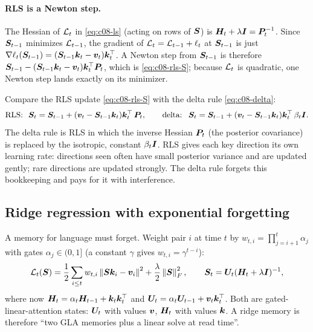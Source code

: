 \paragraph{RLS is a Newton step.} The Hessian of $\mathcal{L}_t$ in \eqref{eq:c08-ls} (acting on rows of
$\bm{S}$) is $\bm{H}_t+\lambda\bm{I}=\bm{P}_t^{-1}$. Since $\bm{S}_{t-1}$ minimizes $\mathcal{L}_{t-1}$, the gradient of
$\mathcal{L}_t=\mathcal{L}_{t-1}+\ell_t$ at $\bm{S}_{t-1}$ is just $\nabla\ell_t(\bm{S}_{t-1})=(\bm{S}_{t-1}\bm{k}_t-\bm{v}_t)
\bm{k}_t^{\top}$. A Newton step from $\bm{S}_{t-1}$ is therefore
$\bm{S}_{t-1}-(\bm{S}_{t-1}\bm{k}_t-\bm{v}_t)\bm{k}_t^{\top}\bm{P}_t$, which is \eqref{eq:c08-rls-S}; because $\mathcal{L}_t$ is
quadratic, one Newton step lands exactly on its minimizer.

\begin{keyidea}[title={Key idea: the delta rule is RLS with an identity covariance}]
Compare the RLS update \eqref{eq:c08-rls-S} with the delta rule \eqref{eq:c08-delta}:
\[
  \text{RLS: }\ \mS_t=\mS_{t-1}+(\vv_t-\mS_{t-1}\vk_t)\vk_t\T\,\mP_t, \qquad
  \text{delta: }\ \mS_t=\mS_{t-1}+(\vv_t-\mS_{t-1}\vk_t)\vk_t\T\,\beta_t\mI .
\]
The delta rule is RLS in which the inverse Hessian $\bm{P}_t$ (the posterior covariance) is replaced
by the isotropic, constant $\beta_t\bm{I}$. RLS gives each key direction its own learning rate:
directions seen often have small posterior variance and are updated gently; rare directions are
updated strongly. The delta rule forgets this bookkeeping and pays for it with interference.
\end{keyidea}

\subsection{Ridge regression with exponential forgetting}\label{sec:c08-ewridge}

A memory for language must forget. Weight pair $i$ at time $t$ by $w_{t,i}=\prod_{j=i+1}^{t}
\alpha_j$ with gates $\alpha_j\in(0,1]$ (a constant $\gamma$ gives $w_{t,i}=\gamma^{t-i}$):
\begin{equation}\label{eq:c08-ewls}
  \mathcal{L}_t(\bm{S})=\frac12\sum_{i\le t}w_{t,i}\left\lVert \bm{S}\bm{k}_i-\bm{v}_i\right\rVert^2+\frac{\lambda}{2}\left\lVert \bm{S}\right\rVert_F^2 ,
  \qquad
  \bm{S}_t=\bm{U}_t(\bm{H}_t+\lambda\bm{I})^{-1},
\end{equation}
where now $\bm{H}_t=\alpha_t\bm{H}_{t-1}+\bm{k}_t\bm{k}_t^{\top}$ and $\bm{U}_t=\alpha_t\bm{U}_{t-1}+\bm{v}_t\bm{k}_t^{\top}$. Both
are gated-linear-attention states: $\bm{U}_t$ with values $\bm{v}$, $\bm{H}_t$ with values $\bm{k}$. A ridge
memory is therefore ``two GLA memories plus a linear solve at read time''.

